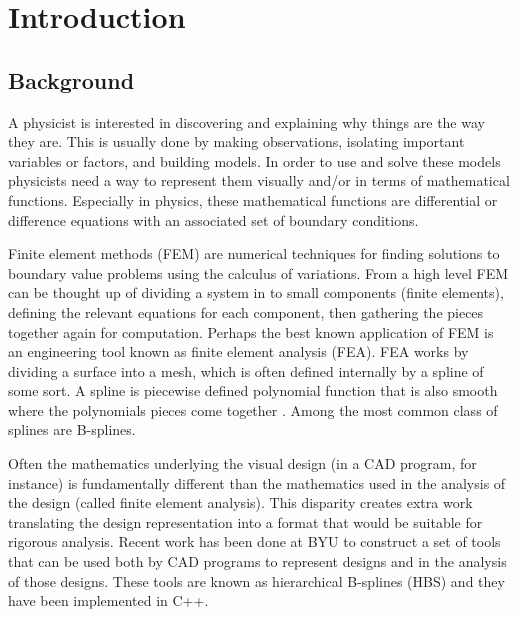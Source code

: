 \section{Introduction} \label{sec:Intro}

  \subsection{Background} \label{ssec:background}

    A physicist is interested in discovering and explaining why things are the way they are. This is usually done by making observations, isolating important variables or factors, and building models. In order to use and solve these models physicists need a way to represent them visually and/or in terms of mathematical functions. Especially in physics, these mathematical functions are differential or difference equations with an associated set of boundary conditions.

    Finite element methods (FEM) are numerical techniques for finding solutions to boundary value problems using the calculus of variations. From a high level FEM can be thought up of dividing a system in to small components (finite elements), defining the relevant equations for each component, then gathering the pieces together again for computation. Perhaps the best known application of FEM is an engineering tool known as finite element analysis (FEA). FEA works by dividing a surface into a mesh, which is often defined internally by a spline of some sort. A spline is piecewise defined polynomial function that is also smooth where the polynomials pieces come together \cite{judd1998}. Among the most common class of splines are B-splines.


    Often the mathematics underlying the visual design (in a CAD program, for instance) is fundamentally different than the mathematics used in the analysis of the design (called finite element analysis). This disparity creates extra work translating the design representation into a format that would be suitable for rigorous analysis. Recent work has been done at BYU to construct a set of tools that can be used both by CAD programs to represent designs and in the analysis of those designs. These tools are known as hierarchical B-splines (HBS) and they have been implemented in C++.

